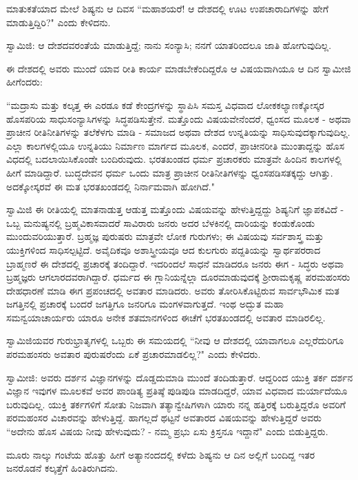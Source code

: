 ಮಾತುಕತೆಯಾದ ಮೇಲೆ ಶಿಷ್ಯನು ಆ ದಿವಸ “ಮಹಾಶಯರೆ! ಆ ದೇಶದಲ್ಲಿ ಊಟ ಉಪಚಾರಾದಿಗಳನ್ನು ಹೇಗೆ ಮಾಡುತ್ತಿದ್ದಿರಿ?" ಎಂದು ಕೇಳಿದನು.

ಸ್ವಾಮಿಜಿ: ಆ ದೇಶದವರಂತೆಯೆ ಮಾಡುತ್ತಿದ್ದೆ; ನಾನು ಸಂನ್ಯಾಸಿ; ನನಗೆ ಯಾತರಿಂದಲೂ ಜಾತಿ ಹೋಗುವುದಿಲ್ಲ.

ಈ ದೇಶದಲ್ಲಿ ಅವರು ಮುಂದೆ ಯಾವ ರೀತಿ ಕಾರ್ಯ ಮಾಡಬೇಕೆಂದಿದ್ದರೊ ಆ ವಿಷಯವಾಗಿಯೂ ಆ ದಿನ ಸ್ವಾಮೀಜಿ ಹೀಗೆಂದರು:

“ಮದ್ರಾಸು ಮತ್ತು ಕಲ್ಕತ್ತ ಈ ಎರಡೂ ಕಡೆ ಕೇಂದ್ರಗಳನ್ನು ಸ್ಥಾಪಿಸಿ ಸಮಸ್ತ ವಿಧವಾದ ಲೋಕಕಲ್ಯಾಣಕ್ಕೋಸ್ಕರ ಹೊಸಪರಿಯ ಸಾಧುಸಂನ್ಯಾಸಿಗಳನ್ನು ಸಿದ್ಧಪಡಿಸುತ್ತೇನೆ. ಮತ್ತೊಂದು ವಿಷಯವೇನೆಂದರೆ, ಧ್ವಂಸದ ಮೂಲಕ - ಅಥವಾ ಪ್ರಾಚೀನ ರೀತಿನೀತಿಗಳನ್ನು ತಲೆಕೆಳಗು ಮಾಡಿ - ಸಮಾಜದ ಅಥವಾ ದೇಶದ ಉನ್ನತಿಯನ್ನು ಸಾಧಿಸುವುದಕ್ಕಾಗುವುದಿಲ್ಲ. ಎಲ್ಲಾ ಕಾಲಗಳಲ್ಲಿಯೂ ಉನ್ನತಿಯು ನಿರ್ಮಾಣ ಮಾರ್ಗದ ಮೂಲಕ, ಎಂದರೆ, ಪ್ರಾಚೀನರೀತಿ ಮುಂತಾದ್ದನ್ನು ಹೊಸ ವಿಧದಲ್ಲಿ ಬದಲಾಯಿಸಿಕೊಂಡೇ ಬಂದಿರುವುದು. ಭರತಖಂಡದ ಧರ್ಮ ಪ್ರಚಾರಕರು ಮಾತ್ರವೇ ಹಿಂದಿನ ಕಾಲಗಳಲ್ಲಿ ಹೀಗೆ ಮಾಡಿದ್ದಾರೆ. ಬುದ್ಧದೇವನ ಧರ್ಮ ಒಂದು ಮಾತ್ರ ಪ್ರಾಚೀನ ರೀತಿನೀತಿಗಳನ್ನು ಧ್ವಂಸಪಡಿಸತಕ್ಕದ್ದು ಆಗಿತ್ತು. ಅದಕ್ಕೋಸ್ಕರವೆ ಈ ಮತ ಭರತಖಂಡದಲ್ಲಿ ನಿರ್ನಾಮವಾಗಿ ಹೋಗಿದೆ."

ಸ್ವಾಮಿಜಿ ಈ ರೀತಿಯಲ್ಲಿ ಮಾತನಾಡುತ್ತ ಆಡುತ್ತ ಮತ್ತೊಂದು ವಿಷಯವನ್ನು ಹೇಳುತ್ತಿದ್ದದ್ದು ಶಿಷ್ಯನಿಗೆ ಜ್ಞಾಪಕವಿದೆ - ಒಬ್ಬ ಮನುಷ್ಯನಲ್ಲಿ ಬ್ರಹ್ಮವಿಕಾಸವಾದರೆ ಸಾವಿರಾರು ಜನರು ಅದರ ಬೆಳಕಿನಲ್ಲಿ ದಾರಿಯನ್ನು ಕಂಡುಕೊಂಡು ಮುಂದುವರಿಯುತ್ತಾರೆ. ಬ್ರಹ್ಮಜ್ಞ ಪುರುಷರು ಮಾತ್ರವೇ ಲೋಕ ಗುರುಗಳು; ಈ ವಿಷಯವು ಸರ್ವಶಾಸ್ತ್ರ ಮತ್ತು ಯುಕ್ತಿಗಳಿಂದ ಸಾಧಿಸಲ್ಪಟ್ಟಿದೆ. ಅವೈದಿಕವೂ ಅಶಾಸ್ತ್ರೀಯವೂ ಆದ ಕುಲಗುರು ಪದ್ದತಿಯನ್ನು ಸ್ವಾರ್ಥಪರರಾದ ಬ್ರಾಹ್ಮಣರೆ ಈ ದೇಶದಲ್ಲಿ ಪ್ರಚಾರಕ್ಕೆ ತಂದಿದ್ದಾರೆ. ಇದರಿಂದಲೆ ಸಾಧನೆ ಮಾಡಿದರೂ ಜನರು ಈಗ - ಸಿದ್ಧರು ಅಥವಾ ಬ್ರಹ್ಮಜ್ಞರು ಆಗಲಾರದವರಾಗಿದ್ದಾರೆ. ಧರ್ಮದ ಈ ಗ್ಲಾನಿಯನ್ನೆಲ್ಲಾ ದೂರಮಾಡುವುದಕ್ಕೆ ಶ‍್ರೀರಾಮಕೃಷ್ಣ ಪರಮಹಂಸರು ದೇಹಧಾರಣೆ ಮಾಡಿ ಈಗ ಪ್ರಪಂಚದಲ್ಲಿ ಅವತಾರ ಮಾಡಿದರು. ಅವರು ತೋರಿಸಿಕೊಟ್ಟಿರುವ ಸಾರ್ವಭೌಮಿಕ ಮತ ಜಗತ್ತಿನಲ್ಲಿ ಪ್ರಚಾರಕ್ಕೆ ಬಂದರೆ ಜಗತ್ತಿಗೂ ಜನರಿಗೂ ಮಂಗಳವಾಗುತ್ತದೆ. ಇಂಥ ಅದ್ಭುತ ಮಹಾ ಸಮನ್ವಯಾಚಾರ್ಯರು ಯಾರೂ ಅನೇಕ ಶತಮಾನಗಳಿಂದ ಈಚೆಗೆ ಭರತಖಂಡದಲ್ಲಿ ಅವತಾರ ಮಾಡಿರಲಿಲ್ಲ.

ಸ್ವಾಮಿಜಿಯವರ ಗುರುಭ್ರಾತೃಗಳಲ್ಲಿ ಒಬ್ಬರು ಈ ಸಮಯದಲ್ಲಿ “ನೀವು ಆ ದೇಶದಲ್ಲಿ ಯಾವಾಗಲೂ ಎಲ್ಲರೆದುರಿಗೂ ಪರಮಹಂಸರು ಅವತಾರ ಪುರುಷರೆಂದು ಏಕೆ ಪ್ರಚಾರಮಾಡಲಿಲ್ಲ?" ಎಂದು ಕೇಳಿದರು.

ಸ್ವಾಮೀಜಿ: ಅವರು ದರ್ಶನ ವಿಜ್ಞಾನಗಳನ್ನು ದೊಡ್ಡದುಮಾಡಿ ಮುಂದೆ ತಂದಿಡುತ್ತಾರೆ. ಆದ್ದರಿಂದ ಯುಕ್ತಿ ತರ್ಕ ದರ್ಶನ ವಿಜ್ಞಾನ ಇವುಗಳ ಮೂಲಕವೆ ಅವರ ಪಾಂಡಿತ್ಯ ಪ್ರತಿಷ್ಠೆ ಪುಡಿಪುಡಿ ಮಾಡದಿದ್ದರೆ, ಯಾವ ವಿಧವಾದ ಮರ್ಯಾದೆಯೂ ಬರುವುದಿಲ್ಲ. ಯುಕ್ತಿ ತರ್ಕಗಳಿಗೆ ಸೋತು ನಿಜವಾಗಿ ತತ್ಯಾನ್ವೇಷಿಗಳಾಗಿ ಯಾರು ನನ್ನ ಹತ್ತಿರಕ್ಕೆ ಬರುತ್ತಿದ್ದರೊ ಅವರಿಗೆ ಪರಮಹಂಸರ ವಿಚಾರವನ್ನು ಹೇಳುತ್ತಿದ್ದೆ. ಹಾಗಲ್ಲದೆ ಥಟ್ಟನೆ ಅವತಾರದ ವಿಷಯವನ್ನು ಹೇಳುತ್ತಿದ್ದರೆ ಅವರು “ಅದೇನು ಹೊಸ ವಿಷಯ ನೀವು ಹೇಳುವುದು? - ನಮ್ಮ ಪ್ರಭು ಏಸು ಕ್ರಿಸ್ತನೂ ಇದ್ದಾನೆ" ಎಂದು ಬಿಡುತ್ತಿದ್ದರು.

ಮೂರು ನಾಲ್ಕು ಗಂಟೆಯ ಹೊತ್ತು ಹೀಗೆ ಅತ್ಯಾನಂದದಲ್ಲಿ ಕಳೆದು ಶಿಷ್ಯನು ಆ ದಿನ ಅಲ್ಲಿಗೆ ಬಂದಿದ್ದ ಇತರ ಜನರೊಡನೆ ಕಲ್ಕತ್ತೆಗೆ ಹಿಂತಿರುಗಿದನು.

